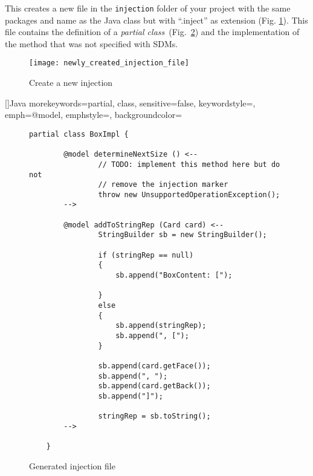 \begin{enumerate}
    This creates a new file in the \texttt{injection} folder of your project with the same packages and name as the Java class but with ``.inject'' as extension
    (Fig. \ref{fig:injection_created_injection_file}). This file contains the definition of a \textit{partial class}~(Fig.~\ref{code:generated_inject_file}) and
    the implementation of the method that was not specified with SDMs.

    \begin{figure}[htbp]
        \centering
        \texttt{[image: newly\_created\_injection\_file]}
        \caption{Create a new injection}
        \label{fig:injection_created_injection_file}
    \end{figure}
    \FloatBarrier

    []{Java}{
        morekeywords={partial, class},
        sensitive=false,
        keywordstyle={\bfseries\color{purple}},
        emph={@model},
        emphstyle={\color{blue}},
        backgroundcolor=\color{white}
    }

    \begin{figure}[htbp]
        \centering
        \begin{lstlisting}[language=Injection]
    partial class BoxImpl {

        @model determineNextSize () <--
                // TODO: implement this method here but do not 
                // remove the injection marker
                throw new UnsupportedOperationException();
        -->

        @model addToStringRep (Card card) <--
                StringBuilder sb = new StringBuilder();

                if (stringRep == null)
                {
                    sb.append("BoxContent: [");

                }
                else
                {
                    sb.append(stringRep);
                    sb.append(", [");
                }

                sb.append(card.getFace());
                sb.append(", ");
                sb.append(card.getBack());
                sb.append("]");

                stringRep = sb.toString();
        -->

    }
        \end{lstlisting}
        \caption{Generated injection file}
        \label{code:generated_inject_file}
    \end{figure}
    \FloatBarrier


\end{enumerate}
